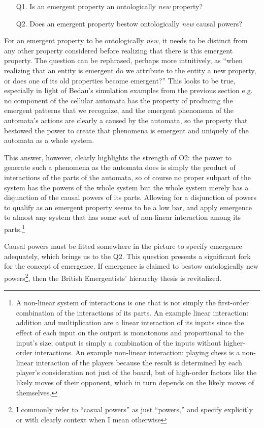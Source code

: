\documentclass{article}
\newcommand{\ti}[1]{\textit{#1}}
\begin{document}
\begin{enumerate}
    \item[Q1.] Is an emergent property an ontologically \ti{new} property?
    \item[Q2.] Does an emergent property bestow ontologically \ti{new} causal powers?
\end{enumerate}

For an emergent property to be ontologically \ti{new}, it needs to be distinct from any other property considered before realizing that there is this emergent property. The question can be rephrased, perhaps more intuitively, as ``when realizing that an entity is emergent do we attribute to the entity a new property, or does one of its old properties become emergent?'' This looks to be true, especially in light of Bedau's simulation examples from the previous section e.g. no component of the cellular automata has the property of producing the emergent patterns that we recognize, and the emergent phenomena of the automata's actions are clearly a caused by the automata, so the property that bestowed the power to create that phenomena is emergent and uniquely of the automata as a whole system.

This answer, however, clearly highlights the strength of O2: the power to generate such a phenomena as the automata does is simply the product of interactions of the parts of the automata, so of course no proper subpart of the system has the powers of the whole system but the whole system merely has a disjunction of the causal powers of its parts. Allowing for a disjunction of powers to qualify as an emergent property seems to be a low bar, and apply emergence to almost any system that has some sort of non-linear interaction among its parts.\footnote{A non-linear system of interactions is one that is not simply the first-order combination of the interactions of its parts. An example linear interaction: addition and multiplication are a linear interaction of its inputs since the effect of each input on the output is monotonous and proportional to the input's size; output is simply a combination of the inputs without higher-order interactions. An example non-linear interaction: playing chess is a non-linear interaction of the players because the result is determined by each player's consideration not just of the board, but of high-order factors like the likely moves of their opponent, which in turn depends on the likely moves of themselves.}

Causal powers must be fitted somewhere in the picture to specify emergence adequately, which brings us to the Q2. This question presents a significant fork for the concept of emergence. If emergence is claimed to bestow ontologically new powers\footnote{I commonly refer to ``casual powers'' as just ``powers,'' and specify explicitly or with clearly context when I mean otherwise}, then the British Emergentists' hierarchy thesis is revitalized.
\end{document}
